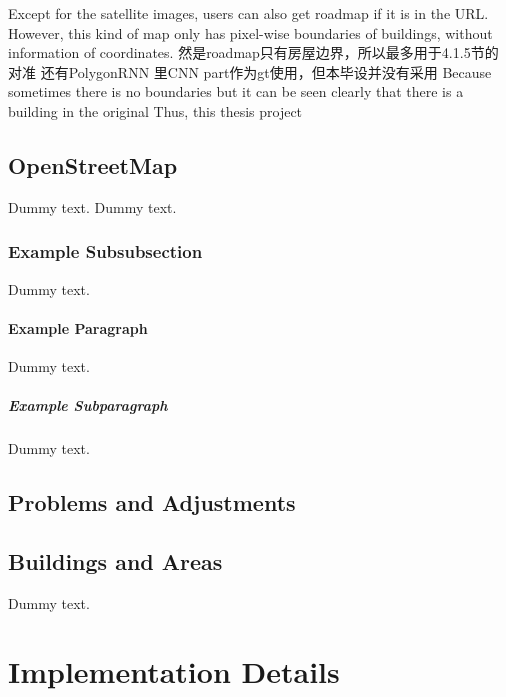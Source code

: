 


Except for the satellite images, users can also get roadmap if it is in the URL. 
However, this kind of map only has pixel-wise boundaries of buildings, without information of coordinates.
然是roadmap只有房屋边界，所以最多用于4.1.5节的对准
还有PolygonRNN 里CNN part作为gt使用，但本毕设并没有采用
Because sometimes there is no boundaries but it can be seen clearly that there is a building in the original
Thus, this thesis project 

\subsection{OpenStreetMap}\label{osm}

Dummy text.
Dummy text.

\subsubsection{Example Subsubsection}

Dummy text.

\paragraph{Example Paragraph}

Dummy text.

\subparagraph{Example Subparagraph}

Dummy text.

\subsection{Problems and Adjustments}\label{pa}



\subsection{Buildings and Areas}\label{ba}

Dummy text.



\section{Implementation Details}\label{id}


